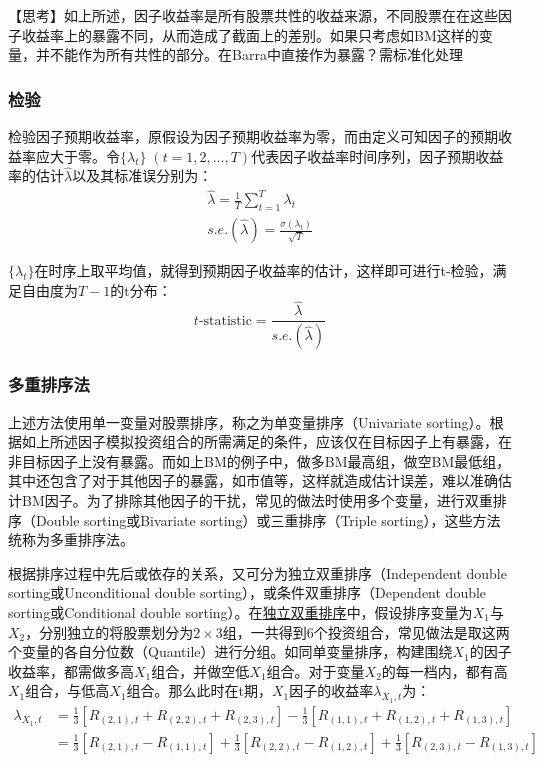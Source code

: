 \documentclass[11pt]{article}
\begin{document}
【思考】如上所述，因子收益率是所有股票共性的收益来源，不同股票在在这些因子收益率上的暴露不同，从而造成了截面上的差别。如果只考虑如BM这样的变量，并不能作为所有共性的部分。在Barra中直接作为暴露？需标准化处理

\subsubsection{检验}

检验因子预期收益率，原假设为因子预期收益率为零，而由定义可知因子的预期收益率应大于零。令$\{\lambda_t\} \; (t=1,2,\dots,T)$代表因子收益率时间序列，因子预期收益率的估计$\hat{\lambda}$以及其标准误分别为：
\begin{gather*}
    \hat{\lambda} = \frac{1}{T}\sum_{t=1}^{T} \lambda_t \\
    s.e.(\hat{\lambda}) = \frac{\sigma(\lambda_t)}{\sqrt{T}}
\end{gather*}

$\{\lambda_t\}$在时序上取平均值，就得到预期因子收益率的估计，这样即可进行t-检验，满足自由度为$T-1$的t分布：
\begin{equation*}
    t\text{-statistic} = \frac{\hat{\lambda}}{s.e.(\hat{\lambda})}
\end{equation*}

\subsubsection{多重排序法}

上述方法使用单一变量对股票排序，称之为单变量排序（Univariate sorting）。根据如上所述因子模拟投资组合的所需满足的条件，应该仅在目标因子上有暴露，在非目标因子上没有暴露。而如上BM的例子中，做多BM最高组，做空BM最低组，其中还包含了对于其他因子的暴露，如市值等，这样就造成估计误差，难以准确估计BM因子。为了排除其他因子的干扰，常见的做法时使用多个变量，进行双重排序（Double sorting或Bivariate sorting）或三重排序（Triple sorting），这些方法统称为多重排序法。

根据排序过程中先后或依存的关系，又可分为独立双重排序（Independent double sorting或Unconditional double sorting），或条件双重排序（Dependent double sorting或Conditional double sorting）。在\uline{独立双重排序}中，假设排序变量为$X_1$与$X_2$，分别独立的将股票划分为$ 2 \times 3$组，一共得到6个投资组合，常见做法是取这两个变量的各自分位数（Quantile）进行分组。如同单变量排序，构建围绕$X_1$的因子收益率，都需做多高$X_1$组合，并做空低$X_1$组合。对于变量$X_2$的每一档内，都有高$X_1$组合，与低高$X_1$组合。那么此时在t期，$X_1$因子的收益率$\lambda_{X_1,t}$为：
\begin{align*}
    \lambda_{X_1,t} &= \frac{1}{3} \left[ R_{(2,1),t} + R_{(2,2),t} + R_{(2,3),t} \right] - \frac{1}{3} \left[R_{(1,1),t} + R_{(1,2),t} + R_{(1,3),t} \right] \\
    &= \frac{1}{3} \left[ R_{(2,1),t} - R_{(1,1),t} \right] + \frac{1}{3} \left[R_{(2,2),t} - R_{(1,2),t} \right] + \frac{1}{3} \left[ R_{(2,3),t} - R_{(1,3),t} \right]
\end{align*}
\end{document}
